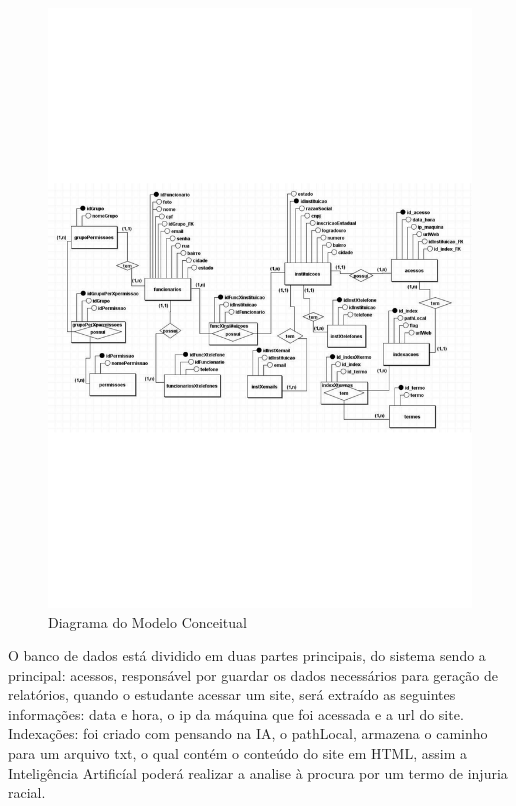 \documentclass[
  a4paper,%
  12pt,%
  english,%
  brazilian,%
]{article}
\begin{document}
    \begin{figure}[H]
        \centering
        \caption{Diagrama do Modelo Conceitual}
        \label{fig:conceit}
        \includegraphics[width=\textwidth]{Logos/Conceitual-ReSist-PDF.pdf}
    \end{figure}
    O banco de dados está dividido em duas partes principais, do sistema sendo a principal: 
    acessos, responsável por guardar os dados necessários para geração de relatórios, quando o estudante acessar um site, será extraído as seguintes informações: data e hora, o ip da máquina que foi acessada e a url do site. Indexações: foi criado com pensando na IA, o pathLocal, armazena o caminho para um arquivo txt, o qual contém o conteúdo do site em HTML, assim a Inteligência Artificíal poderá realizar a analise à procura por um termo de injuria racial.
    
\end{document}
